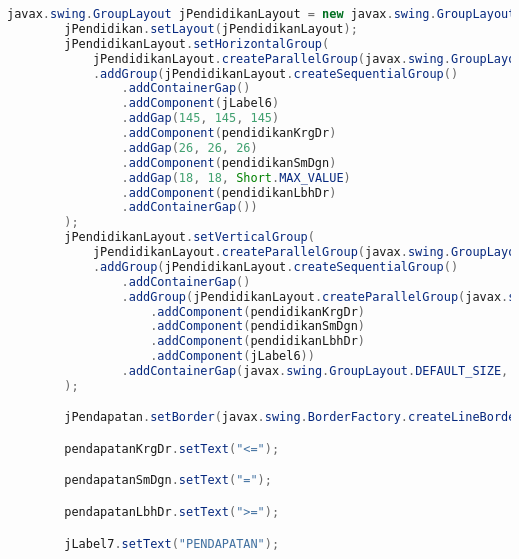 \begin{lstlisting}[language=Java, caption=TampilanKondisiKetetanggaan.java]
        javax.swing.GroupLayout jPendidikanLayout = new javax.swing.GroupLayout(jPendidikan);
        jPendidikan.setLayout(jPendidikanLayout);
        jPendidikanLayout.setHorizontalGroup(
            jPendidikanLayout.createParallelGroup(javax.swing.GroupLayout.Alignment.LEADING)
            .addGroup(jPendidikanLayout.createSequentialGroup()
                .addContainerGap()
                .addComponent(jLabel6)
                .addGap(145, 145, 145)
                .addComponent(pendidikanKrgDr)
                .addGap(26, 26, 26)
                .addComponent(pendidikanSmDgn)
                .addGap(18, 18, Short.MAX_VALUE)
                .addComponent(pendidikanLbhDr)
                .addContainerGap())
        );
        jPendidikanLayout.setVerticalGroup(
            jPendidikanLayout.createParallelGroup(javax.swing.GroupLayout.Alignment.LEADING)
            .addGroup(jPendidikanLayout.createSequentialGroup()
                .addContainerGap()
                .addGroup(jPendidikanLayout.createParallelGroup(javax.swing.GroupLayout.Alignment.BASELINE)
                    .addComponent(pendidikanKrgDr)
                    .addComponent(pendidikanSmDgn)
                    .addComponent(pendidikanLbhDr)
                    .addComponent(jLabel6))
                .addContainerGap(javax.swing.GroupLayout.DEFAULT_SIZE, Short.MAX_VALUE))
        );

        jPendapatan.setBorder(javax.swing.BorderFactory.createLineBorder(new java.awt.Color(0, 0, 0)));

        pendapatanKrgDr.setText("<=");

        pendapatanSmDgn.setText("=");

        pendapatanLbhDr.setText(">=");

        jLabel7.setText("PENDAPATAN");


\end{lstlisting}
